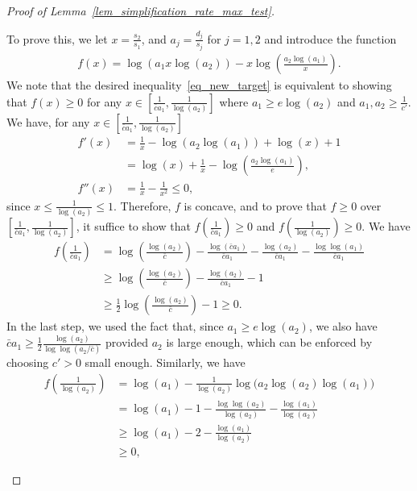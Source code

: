 \documentclass[10pt,a4paper]{amsart}
\begin{document}
\begin{proof}[Proof of Lemma~\ref{lem_simplification_rate_max_test}]
\begin{enumerate}
    To prove this, we let $x = \frac{s_2}{s_1}$, and $a_j = \frac{d_j}{s_j}$ for $j=1,2$ and introduce the function 
\begin{align*}
    f(x) = \log\left(a_1 x \log(a_2)\right) - x \log\left(\frac{a_2\log(a_1)}{x}\right).
\end{align*}
We note that the desired inequality~\eqref{eq_new_target} is equivalent to showing that $f(x) \geq 0$ for any $x \in \left[\frac{1}{\bar c a_1}, \frac{1}{\log(a_2)}\right]$ where $a_1 \geq e \log(a_2)$ and $a_1, a_2 \geq \frac{1}{c'}$.
We have, for any $x \in \left[\frac{1}{\bar c a_1}, \frac{1}{\log(a_2)}\right]$
\begin{align*}
    f'(x) &= \frac{1}{x} - \log(a_2 \log(a_1)) + \log(x) + 1 \\
    & = \log(x) + \frac{1}{x} - \log\left(\frac{a_2 \log(a_1)}{e}\right),\\
    f''(x) &= \frac{1}{x} - \frac{1}{x^2} \leq 0,
\end{align*}
since $x \leq \frac{1}{\log(a_2)} \leq 1$. 
Therefore, $f$ is concave, and to prove that $f \geq 0$ over $\left[\frac{1}{\bar c a_1}, \frac{1}{\log(a_2)}\right]$, it suffice to show that $f\left(\frac{1}{\bar c a_1}\right) \geq 0$ and $f \left(\frac{1}{\log(a_2)}\right)\geq 0$. 
We have
\begin{align*}
    f\left(\frac{1}{\bar c a_1}\right) &= \log\left(\frac{\log(a_2)}{\bar c}\right) - \frac{\log(\bar c a_1)}{\bar c a_1}  - \frac{\log(a_2)}{\bar c a_1} - \frac{\log\log(a_1)}{\bar c a_1}\\
    &\geq \log\left(\frac{\log(a_2)}{\bar c}\right)   - \frac{\log(a_2)}{\bar c a_1} - 1\\
    & \geq \frac{1}{2}\log\left(\frac{\log(a_2)}{\bar c}\right) - 1 \geq 0.
\end{align*}
In the last step, we used the fact that, since $a_1 \geq e \log(a_2)$, we also have $\bar c a_1 \geq \frac{1}{2} \frac{\log(a_2)}{\log \log(a_2/\bar c)}$
provided $a_2$ is large enough, which can be enforced by choosing $c'>0$ small enough. 
Similarly, we have
\begin{align*}
    f\left(\frac{1}{\log(a_2)}\right) &= \log(a_1) - \frac{1}{\log(a_2)} \log\Big(a_2\log(a_2)\log(a_1)\Big)\\
    & = \log(a_1) - 1 - \frac{\log \log(a_2)}{\log(a_2)} - \frac{\log(a_1)}{\log(a_2)}\\
    & \geq \log(a_1) - 2 - \frac{\log(a_1)}{\log(a_2)}\\
    &
    \geq 0,
\end{align*}

\end{enumerate}
\end{proof}
\end{document}
